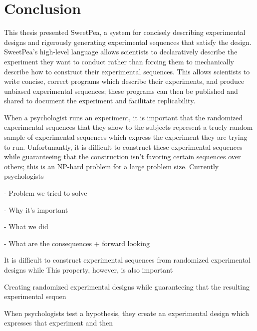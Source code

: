 \chapter{Conclusion}

This thesis presented SweetPea, a system for concisely describing experimental designs and rigerously generating experimental sequences that satisfy the design. SweetPea's high-level language allows scientists to declaratively describe the experiment they want to conduct rather than forcing them to mechanically describe how to construct their experimental sequences. This allows scientists to write concise, correct programs which describe their experiments, and produce unbiased experimental sequences; these programs can then be published and shared to document the experiment and facilitate replicability.


When a psychologist runs an experiment, it is important that the randomized experimental sequences that they show to the subjects represent a truely random sample of experimental sequences which express the experiment they are trying to run. Unfortunantly, it is difficult to construct these experimental sequences while guaranteeing that the construction isn't favoring certain sequences over others; this is an NP-hard problem for a large problem size. Currently psychologists

- Problem we tried to solve

- Why it's important

- What we did

- What are the consequences + forward looking

It is difficult to construct experimental sequences from randomized experimental designs while  This property, however, is also important



Creating randomized experimental designs while guaranteeing that the resulting experimental sequen



When psychologists test a hypothesis, they create an experimental design which expresses that experiment and then
